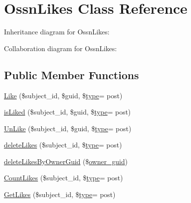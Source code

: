\hypertarget{class_ossn_likes}{}\section{Ossn\+Likes Class Reference}
\label{class_ossn_likes}


Inheritance diagram for Ossn\+Likes\+:


Collaboration diagram for Ossn\+Likes\+:
\subsection*{Public Member Functions}
\begin{DoxyCompactItemize}
\item 
\hyperlink{class_ossn_likes_a5e5139fae4d7caccf57dd9b4ede4d051}{Like} (\$subject\+\_\+id, \$guid, \$\hyperlink{_ossn_wall_2actions_2wall_2post_2group_8php_a2dc1bb4e1ed0029daa81ac0776b14b51}{type}= \textquotesingle{}post\textquotesingle{})
\item 
\hyperlink{class_ossn_likes_a3baca95de684db53db2b0e2f59d25621}{is\+Liked} (\$subject\+\_\+id, \$guid, \$\hyperlink{_ossn_wall_2actions_2wall_2post_2group_8php_a2dc1bb4e1ed0029daa81ac0776b14b51}{type}= \textquotesingle{}post\textquotesingle{})
\item 
\hyperlink{class_ossn_likes_adc475010e49664fad992c97333c88096}{Un\+Like} (\$subject\+\_\+id, \$guid, \$\hyperlink{_ossn_wall_2actions_2wall_2post_2group_8php_a2dc1bb4e1ed0029daa81ac0776b14b51}{type}= \textquotesingle{}post\textquotesingle{})
\item 
\hyperlink{class_ossn_likes_a5e9cd5591ddd2b2ea96a46b0c1d324b0}{delete\+Likes} (\$subject\+\_\+id, \$\hyperlink{_ossn_wall_2actions_2wall_2post_2group_8php_a2dc1bb4e1ed0029daa81ac0776b14b51}{type}= \textquotesingle{}post\textquotesingle{})
\item 
\hyperlink{class_ossn_likes_a45563cbf084047ffa309637c63100529}{delete\+Likes\+By\+Owner\+Guid} (\$\hyperlink{user_8php_a307051fefc937afd02c509c55646f50b}{owner\+\_\+guid})
\item 
\hyperlink{class_ossn_likes_ad2d88f71839b546c755acc10ebb9bc39}{Count\+Likes} (\$subject\+\_\+id, \$\hyperlink{_ossn_wall_2actions_2wall_2post_2group_8php_a2dc1bb4e1ed0029daa81ac0776b14b51}{type}= \textquotesingle{}post\textquotesingle{})
\item 
\hyperlink{class_ossn_likes_aa6e6eb8e21d8252ce6b7a6315b7fa9da}{Get\+Likes} (\$subject\+\_\+id, \$\hyperlink{_ossn_wall_2actions_2wall_2post_2group_8php_a2dc1bb4e1ed0029daa81ac0776b14b51}{type}= \textquotesingle{}post\textquotesingle{})
\end{DoxyCompactItemize}
